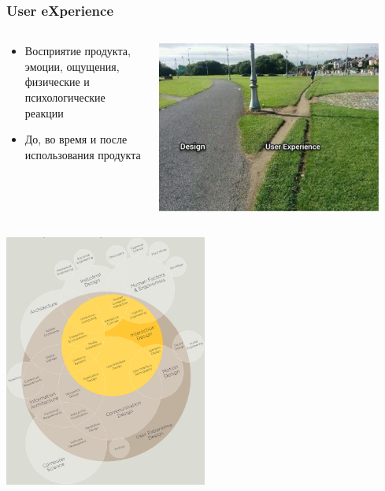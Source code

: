 \documentclass{../../slides-style}
\begin{document}
    \begin{frame}
        \frametitle{User eXperience}
        \begin{columns}
            \begin{column}{0.5\textwidth}
                \begin{itemize}
                    \item Восприятие продукта, эмоции, ощущения, физические и психологические реакции
                    \item До, во время и после использования продукта
                \end{itemize}
            \end{column}
            \begin{column}{0.5\textwidth}
                \begin{center}
                    \includegraphics[width=0.9\textwidth]{uxWay.png}
                \end{center}
            \end{column}
        \end{columns}
    \end{frame}

    \begin{frame}
        \begin{center}
            \includegraphics[width=0.5\textwidth]{uxDesign.png}
        \end{center}
    \end{frame}
\end{document}
